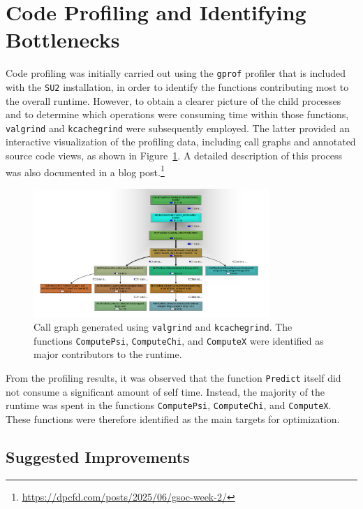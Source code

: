 \documentclass{article}
\begin{document}
\section{Code Profiling and Identifying Bottlenecks}
\label{sec:profile}
Code profiling was initially carried out using the \texttt{gprof} profiler 
that is included with the \texttt{SU2} installation, in order to identify 
the functions contributing most to the overall runtime. However, to obtain 
a clearer picture of the child processes and to determine which operations 
were consuming time within those functions, \texttt{valgrind} and 
\texttt{kcachegrind} were subsequently employed. The latter provided 
an interactive visualization of the profiling data, including call graphs 
and annotated source code views, as shown in Figure~\ref{fig:callgraph}. 
A detailed description of this process was also documented in a 
blog post.\footnote{\url{https://dpcfd.com/posts/2025/06/gsoc-week-2/}}

\begin{figure}[htbp]
    \centering
    \includegraphics[width=0.8\textwidth]{call_graph.png}
    \caption{Call graph generated using \texttt{valgrind} and \texttt{kcachegrind}. 
    The functions \texttt{ComputePsi}, \texttt{ComputeChi}, and \texttt{ComputeX} 
    were identified as major contributors to the runtime.}
    \label{fig:callgraph}
\end{figure}

From the profiling results, it was observed that the function 
\texttt{Predict} itself did not consume a significant amount of self time. 
Instead, the majority of the runtime was spent in the functions 
\texttt{ComputePsi}, \texttt{ComputeChi}, and \texttt{ComputeX}. 
These functions were therefore identified as the main targets for optimization.

\subsection{Suggested Improvements}
\end{document}
